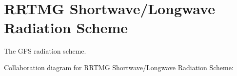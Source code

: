 \section{R\+R\+T\+MG Shortwave/\+Longwave Radiation Scheme}
\label{group___r_r_t_m_g}


The G\+FS radiation scheme.  


Collaboration diagram for R\+R\+T\+MG Shortwave/\+Longwave Radiation Scheme\+:
